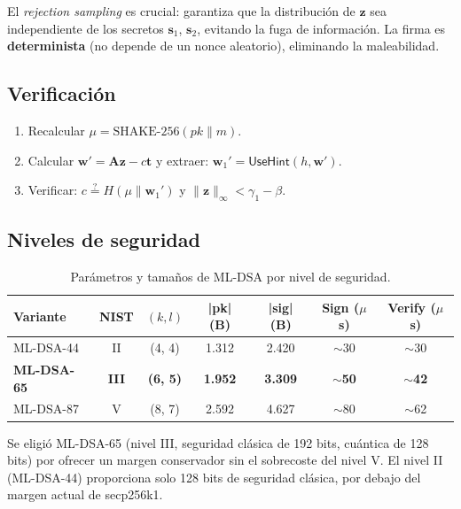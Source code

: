 El \emph{rejection sampling} es crucial: garantiza que la distribución de $\mathbf{z}$ sea independiente de los secretos $\mathbf{s}_1$, $\mathbf{s}_2$, evitando la fuga de información. La firma es \textbf{determinista} (no depende de un nonce aleatorio), eliminando la maleabilidad.

\subsection{Verificación}

\begin{enumerate}
  \item Recalcular $\mu = \text{SHAKE-256}(\mathit{pk} \| m)$.
  \item Calcular $\mathbf{w}' = \mathbf{A}\mathbf{z} - c\mathbf{t}$ y extraer: $\mathbf{w}_1' = \textsf{UseHint}(h, \mathbf{w}')$.
  \item Verificar: $c \stackrel{?}{=} H(\mu \| \mathbf{w}_1')$ y $\|\mathbf{z}\|_\infty < \gamma_1 - \beta$.
\end{enumerate}

\subsection{Niveles de seguridad}

\begin{table}[htbp]
\centering
\caption{Parámetros y tamaños de ML-DSA por nivel de seguridad.}
\label{tab:mldsa_params}
\begin{tabular}{@{}lcccccc@{}}
\toprule
\textbf{Variante} & \textbf{NIST} & $(k, l)$ & \textbf{|pk| (B)} & \textbf{|sig| (B)} & \textbf{Sign ($\mu$s)} & \textbf{Verify ($\mu$s)} \\
\midrule
ML-DSA-44 & II & (4, 4) & 1.312 & 2.420 & $\sim$30 & $\sim$30 \\
\textbf{ML-DSA-65} & \textbf{III} & \textbf{(6, 5)} & \textbf{1.952} & \textbf{3.309} & $\boldsymbol{\sim}$\textbf{50} & $\boldsymbol{\sim}$\textbf{42} \\
ML-DSA-87 & V & (8, 7) & 2.592 & 4.627 & $\sim$80 & $\sim$62 \\
\bottomrule
\end{tabular}
\end{table}

Se eligió ML-DSA-65 (nivel III, seguridad clásica de 192 bits, cuántica de 128 bits) por ofrecer un margen conservador sin el sobrecoste del nivel V. El nivel II (ML-DSA-44) proporciona solo 128 bits de seguridad clásica, por debajo del margen actual de secp256k1.


